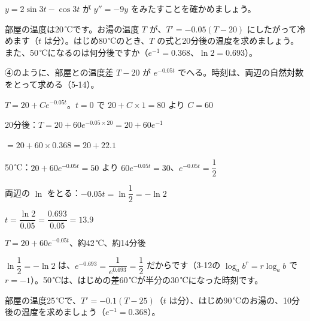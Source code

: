 \begin{jibun}
$y=2\sin3t-\cos3t$ が $y''=-9y$ をみたすことを確かめましょう。
\end{jibun}

\begin{reidai}[冷めるお湯]
部屋の温度は20\,℃です。お湯の温度 $T$ が、$T'=-0.05(T-20)$ にしたがって冷めます（$t$ は分）。はじめ80\,℃のとき、$T$ の式と20分後の温度を求めましょう。また、50\,℃になるのは何分後ですか（$e^{-1}=0.368$、$\ln2=0.693$）。\par
\kangaekata ④のように、部屋との温度差 $T-20$ が $e^{-0.05t}$ でへる。時刻は、両辺の自然対数をとって求める（5-14）。\par
\shiki $T=20+Ce^{-0.05t}$。$t=0$ で $20+C\times1=80$ より $C=60$\par
\hspace*{2.6\zw}20分後：$T=20+60e^{-0.05\times20}=20+60e^{-1}$\par
\hspace*{4.6\zw}$=20+60\times0.368=20+22.1$\par
\hspace*{2.6\zw}50\,℃：$20+60e^{-0.05t}=50$ より $60e^{-0.05t}=30$、$e^{-0.05t}=\dfrac{1}{2}$\par
\hspace*{2.6\zw}両辺の $\ln$ をとる：$-0.05t=\ln\dfrac{1}{2}=-\ln2$\par
\hspace*{4.6\zw}$t=\dfrac{\ln2}{0.05}=\dfrac{0.693}{0.05}=13.9$\par
\kotae $T=20+60e^{-0.05t}$、約42\,℃、約14分後
\end{reidai}
$\ln\dfrac{1}{2}=-\ln2$ は、$e^{-0.693}=\dfrac{1}{e^{0.693}}=\dfrac{1}{2}$ だからです（3-12の $\log_ab^r=r\log_ab$ で $r=-1$）。50\,℃は、はじめの差60\,℃が半分の30\,℃になった時刻です。

\begin{jibun}
部屋の温度25\,℃で、$T'=-0.1(T-25)$（$t$ は分）、はじめ90\,℃のお湯の、10分後の温度を求めましょう（$e^{-1}=0.368$）。
\end{jibun}

